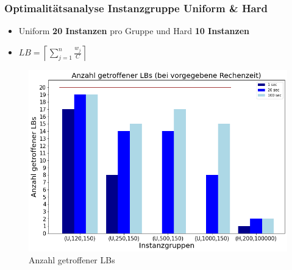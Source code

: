 \documentclass{beamer}
\begin{document}
\begin{frame}

\frametitle{Optimalitätsanalyse Instanzgruppe Uniform \& Hard}
\begin{footnotesize}
\begin{itemize}
\item Uniform \textbf{20 Instanzen} pro Gruppe und Hard \textbf{10 Instanzen}
\item $LB = \left\lceil\sum_{j=1}^{n} \frac{w_j}{C}\right\rceil$
\end{itemize}
\end{footnotesize}


\begin{figure}[!htbp]
\begin{center}
\includegraphics[scale=0.3]{img/lb_unif_hard.png}
\end{center}
\caption{Anzahl getroffener LBs}
\label{fig:LBs}
\end{figure}



\end{frame}
\end{document}
